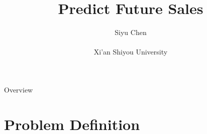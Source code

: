 \documentclass[
 size=14pt,
 paper=smartboard,  %
 mode=present, 		%
 display=slides, 	%
 style=tuliplab,  	%
 pauseslide,
 fleqn,leqno]{powerdot}
\title{Predict Future Sales}
\author{
Siyu Chen
\\
\\Xi'an Shiyou University

}
\date{\gitCommitterDate}
\begin{document}
\maketitle



\begin{slide}[toc=,bm=]{Overview}
\tableofcontents[content=currentsection,type=1]
\end{slide}


\section{Problem Definition}
\end{document}

